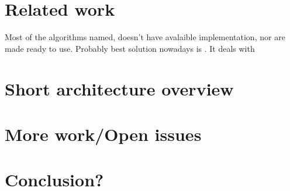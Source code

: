 \documentclass[a4paper,10pt,oneside,twocolumn]{article}
\begin{document}
\section*{Related work}
Most of the algorithms named, doesn't have avalaible implementation, nor are made ready to use.
Probably best solution nowadays is \cite{Bex:2008:SSI:1376616.1376750}.
It deals with 

\section*{Short architecture overview}

\section*{More work/Open issues}

\section*{Conclusion?}

\newpage


\end{document}
